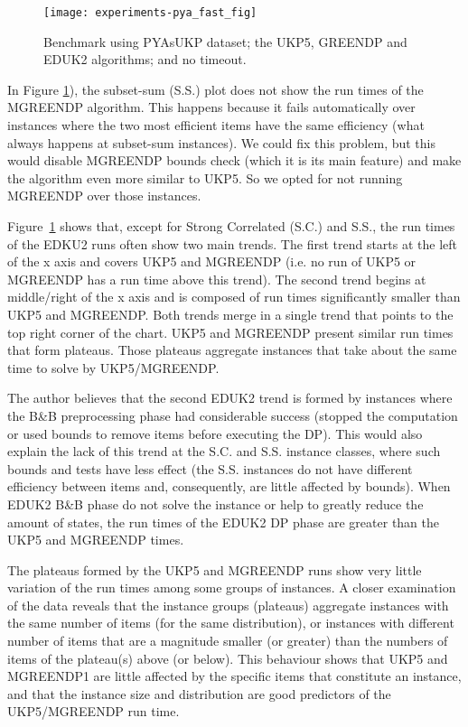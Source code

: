 \begin{figure}[h]
\caption{Benchmark using PYAsUKP dataset; the UKP5, GREENDP and EDUK2 algorithms; and no timeout.}
\begin{center}
\texttt{[image: experiments-pya\_fast\_fig]}
\end{center}
\label{fig:pya_fast}
\end{figure}

In Figure \ref{fig:pya_fast}), the subset-sum (S.S.) plot does not show the run times of the MGREENDP algorithm.
This happens because it fails automatically over instances where the two most efficient items have the same efficiency (what always happens at subset-sum instances).
We could fix this problem, but this would disable MGREENDP bounds check (which it is its main feature) and make the algorithm even more similar to UKP5.
So we opted for not running MGREENDP over those instances.

Figure~\ref{fig:pya_fast} shows that, except for Strong Correlated (S.C.) and S.S., the run times of the EDKU2 runs often show two main trends.
The first trend starts at the left of the x axis and covers UKP5 and MGREENDP (i.e. no run of UKP5 or MGREENDP has a run time above this trend).
The second trend begins at middle/right of the x axis and is composed of run times significantly smaller than UKP5 and MGREENDP.
Both trends merge in a single trend that points to the top right corner of the chart.
UKP5 and MGREENDP present similar run times that form plateaus.
Those plateaus aggregate instances that take about the same time to solve by UKP5/MGREENDP.

The author believes that the second EDUK2 trend is formed by instances where the B\&B preprocessing phase had considerable success (stopped the computation or used bounds to remove items before executing the DP).
This would also explain the lack of this trend at the S.C. and S.S. instance classes, where such bounds and tests have less effect (the S.S. instances do not have different efficiency between items and, consequently, are little affected by bounds).
When EDUK2 B\&B phase do not solve the instance or help to greatly reduce the amount of states, the run times of the EDUK2 DP phase are greater than the UKP5 and MGREENDP times.

The plateaus formed by the UKP5 and MGREENDP runs show very little variation of the run times among some groups of instances.
A closer examination of the data reveals that the instance groups (plateaus) aggregate instances with the same number of items (for the same distribution), or instances with different number of items that are a magnitude smaller (or greater) than the numbers of items of the plateau(s) above (or below).
This behaviour shows that UKP5 and MGREENDP1 are little affected by the specific items that constitute an instance, and that the instance size and distribution are good predictors of the UKP5/MGREENDP run time.

